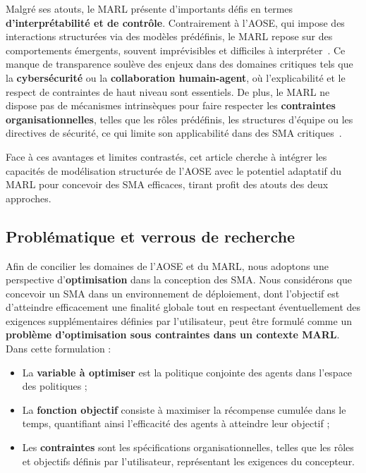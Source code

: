 \documentclass[pdflatex,sn-mathphys-num]{sn-jnl}%
\theoremstyle{thmstyleone}%
\theoremstyle{thmstyletwo}%
\theoremstyle{thmstylethree}%
\begin{document}
Malgré ses atouts, le MARL présente d'importants défis en termes \textbf{d'interprétabilité et de contrôle}. Contrairement à l'AOSE, qui impose des interactions structurées via des modèles prédéfinis, le MARL repose sur des comportements émergents, souvent imprévisibles et difficiles à interpréter~\cite{Du2022}. Ce manque de transparence soulève des enjeux dans des domaines critiques tels que la \textbf{cybersécurité} ou la \textbf{collaboration humain-agent}, où l'explicabilité et le respect de contraintes de haut niveau sont essentiels. De plus, le MARL ne dispose pas de mécanismes intrinsèques pour faire respecter les \textbf{contraintes organisationnelles}, telles que les rôles prédéfinis, les structures d'équipe ou les directives de sécurité, ce qui limite son applicabilité dans des SMA critiques~\cite{Nguyen2020}.

Face à ces avantages et limites contrastés, cet article cherche à intégrer les capacités de modélisation structurée de l'AOSE avec le potentiel adaptatif du MARL pour concevoir des SMA efficaces, tirant profit des atouts des deux approches.

\subsection{Problématique et verrous de recherche}

Afin de concilier les domaines de l'AOSE et du MARL, nous adoptons une perspective d'\textbf{optimisation} dans la conception des SMA. Nous considérons que concevoir un SMA dans un environnement de déploiement, dont l'objectif est d'atteindre efficacement une finalité globale tout en respectant éventuellement des exigences supplémentaires définies par l'utilisateur, peut être formulé comme un \textbf{problème d'optimisation sous contraintes dans un contexte MARL}. Dans cette formulation :
\begin{itemize}
    \item La \textbf{variable à optimiser} est la politique conjointe des agents dans l'espace des politiques ;
    \item La \textbf{fonction objectif} consiste à maximiser la récompense cumulée dans le temps, quantifiant ainsi l'efficacité des agents à atteindre leur objectif ;
    \item Les \textbf{contraintes} sont les spécifications organisationnelles, telles que les rôles et objectifs définis par l'utilisateur, représentant les exigences du concepteur.
\end{itemize}
\end{document}
